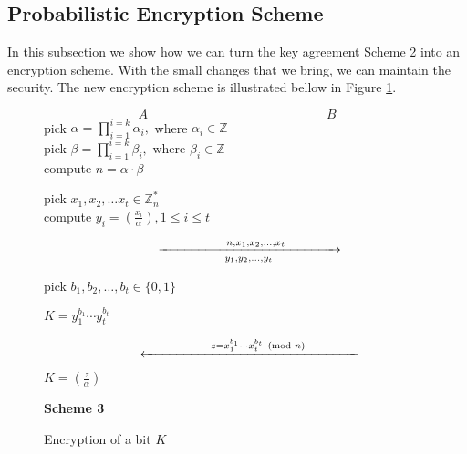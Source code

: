 \documentclass[11pt, a4paper, twoside, openright]{report}
\begin{document}
				
		 
	\subsection{Probabilistic Encryption Scheme}
		In this subsection we show how we can turn the key agreement Scheme 2 into an encryption scheme. With the small changes that we bring, we can maintain
		the security. 
		The new encryption scheme is illustrated bellow in Figure \ref{enc2}. 

 		\begin{figure}[th]
		
		\begin{equation*}
		A \qquad  \qquad \qquad \qquad \qquad \qquad \qquad B
		\end{equation*}
			pick $\alpha = \prod_{i=1}^{i=k} \alpha_i,$ where $\alpha_i \in \mathbb{Z}$ \\
			pick $\beta = \prod_{i=1}^{i=k} \beta_i,$ where $\beta_i \in \mathbb{Z}$ \\
			compute $n = \alpha \cdot \beta $
			
		\bigskip		
				
		\noindent 
		pick $x_1, x_2, \ldots x_t \in \mathbb{Z}_n^*$ \\
		compute $y_i = (\frac{x_i}{\alpha}), 1 \leq i \leq t$
				 
		\begin{equation*}
		\qquad \xrightarrow[y_1,y_2, \ldots, y_t]{\hspace*{1.8cm} n,x_1,x_2,\ldots,x_t \qquad \qquad}  
		\end{equation*}
				
 
				
		\hspace{80mm} pick $b_1, b_2, \ldots, b_t \in \{ 0,1\}$ 
				
		\hspace{80mm} $K = y_1^{b_1} \cdots y_t^{b_t}$ 			

				
						

		\begin{equation*}
		\qquad \xleftarrow{\hspace*{1.8cm} z= x_1^{b_1} \cdots x_t^{b_t} \pmod{n}  \qquad \qquad}  
		\end{equation*}   
				
		$K = (\frac{z}{\alpha})$ 
		
		\begin{center}
		\textbf{Scheme 3}
		\end{center}
				
		\caption{Encryption of a bit $K$}
		\label{enc2}
		\end{figure}
		
\end{document}
